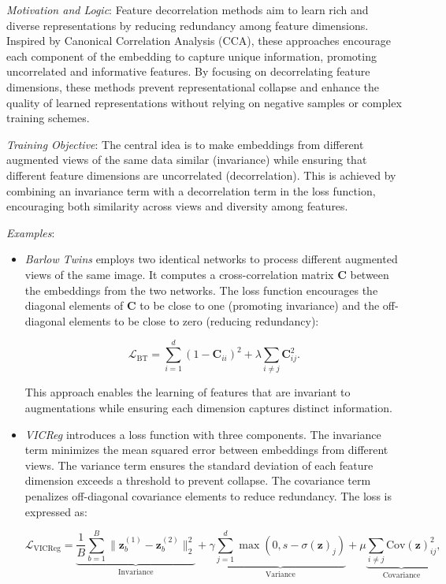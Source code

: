 \begin{itemize}
\begin{itemize}
\emph{Motivation and Logic}: Feature decorrelation methods aim to learn rich and diverse representations by reducing redundancy among feature dimensions. Inspired by Canonical Correlation Analysis (CCA), these approaches encourage each component of the embedding to capture unique information, promoting uncorrelated and informative features. By focusing on decorrelating feature dimensions, these methods prevent representational collapse and enhance the quality of learned representations without relying on negative samples or complex training schemes.

\emph{Training Objective}: The central idea is to make embeddings from different augmented views of the same data similar (invariance) while ensuring that different feature dimensions are uncorrelated (decorrelation). This is achieved by combining an invariance term with a decorrelation term in the loss function, encouraging both similarity across views and diversity among features.

\emph{Examples}:
\begin{itemize}
    \item \emph{Barlow Twins} \citep{zbontar2021barlow} employs two identical networks to process different augmented views of the same image. It computes a cross-correlation matrix \( \mathbf{C} \) between the embeddings from the two networks. The loss function encourages the diagonal elements of \( \mathbf{C} \) to be close to one (promoting invariance) and the off-diagonal elements to be close to zero (reducing redundancy):

    \[
    \mathcal{L}_{\text{BT}} = \sum_{i=1}^d (1 - \mathbf{C}_{ii})^2 + \lambda \sum_{i \neq j} \mathbf{C}_{ij}^2.
    \]

    This approach enables the learning of features that are invariant to augmentations while ensuring each dimension captures distinct information.

    \item \emph{VICReg} \citep{bardes2021vicreg} introduces a loss function with three components. The invariance term minimizes the mean squared error between embeddings from different views. The variance term ensures the standard deviation of each feature dimension exceeds a threshold to prevent collapse. The covariance term penalizes off-diagonal covariance elements to reduce redundancy. The loss is expressed as:

    \[
    \mathcal{L}_{\text{VICReg}} = \underbrace{\frac{1}{B} \sum_{b=1}^B \| \mathbf{z}_b^{(1)} - \mathbf{z}_b^{(2)} \|_2^2}_{\text{Invariance}} + \gamma \underbrace{\sum_{j=1}^d \max(0, s - \sigma(\mathbf{z})_j)}_{\text{Variance}} + \mu \underbrace{\sum_{i \neq j} \text{Cov}(\mathbf{z})_{ij}^2}_{\text{Covariance}},
    \]


\end{itemize}
\end{itemize}
\end{itemize}
